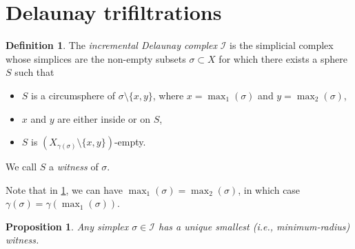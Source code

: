 \documentclass[11pt]{amsart}
\newcommand{\deff}{\emph}
\newcommand{\Incr}[0]{\mathcal{I}}
\theoremstyle{plain}
\newtheorem{proposition}[theorem]{Proposition}
\theoremstyle{definition}
\newtheorem{definition}[theorem]{Definition}
\theoremstyle{remark}
\begin{document}
\section{Delaunay trifiltrations} \label{sec:bifuncdel}
\begin{definition}\label{def:biincremental}
  The \deff{incremental Delaunay complex} $\Incr$ 
  is the simplicial complex whose simplices are the non-empty subsets $\sigma
  \subset X$ for which there exists a sphere $S$ such that 
    \begin{itemize}
    \item $S$ is a circumsphere of $\sigma \setminus
  \{x,y\}$, where $x=\max_1(\sigma)$ and $y=\max_2(\sigma)$,
        \item $x$ and $y$ are either inside or on $S$,
        \item $S$ is $(X_{\gamma(\sigma)}\setminus \{x,y\})$-empty.  %
    \end{itemize}
We call $S$ a \emph{witness} of $\sigma$.
\end{definition}
Note that in \cref{def:biincremental}, we can have $\max_1(\sigma)=\max_2(\sigma)$, in which case $\gamma(\sigma)=\gamma(\max_1(\sigma))$.
%
\begin{proposition}\label{Prop:Min_Rad_Witness}
Any simplex $\sigma\in \Incr$ has a unique smallest (i.e., minimum-radius) witness.
\end{proposition}
%
\end{document}

